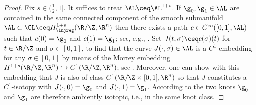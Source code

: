 \begin{proof}
Fix $s\in (\frac{1}{2},1]$.
It suffices to treat $\AL \ceq \AL^{1+s}$.
If $\g_0,\g_1\in\AL$ are contained in the same connected component
of the smooth submanifold $\AL\subset\OL\ceq
H^{1+s}_\injreg(\R/\Z,\R^n)$ then there exists a path $c\in  
C^\infty([0,1],\AL)$ such that
$c(0)=\g_0$ and $c(1)=\g_1$; see, e.g., \cite[Lemma 3.1]{palais_1966}.
Set $J(t,\sigma) \ceq c(\sigma)(t)$ for $t\in\R/\Z$ and $\sigma\in [0,1]$, to
find that the curve
$J(\cdot,\sigma)\in\AL$ is a $C^1$-embedding for any $\sigma\in [0,1]$
by means of the Morrey embedding $H^{1+s}(\R/\Z,\R^n)\hookrightarrow
C^1(\R/\Z,\R^n)$; see \cite[Theorem A.2]{knappmann-etal_2023}. 
Moreover, one can show with this embedding 
that $J$ is also of class $C^1(\R/\Z\times [0,1],
\R^n)$ so that $J$ constitutes a $C^1$-isotopy with $J(\cdot,0)=\g_0$ and
$J(\cdot,1)=\g_1$. According to \cite[Theorem 1.2]{blatt_2009a} the two knots
$\g_0$ and $\g_1$ are therefore ambiently isotopic, i.e., in the same knot
class.


\end{proof}
